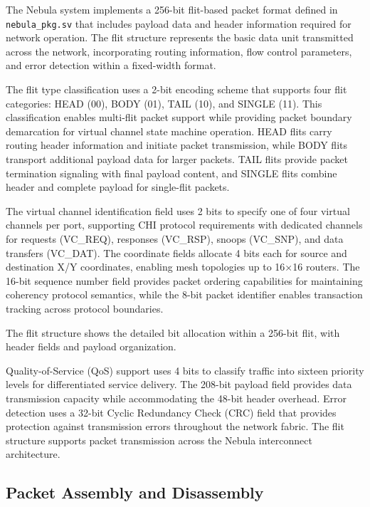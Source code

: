 \documentclass[12pt,letterpaper]{article}
\begin{document}
The Nebula system implements a 256-bit flit-based packet format defined in \texttt{nebula\_pkg.sv} that includes payload data and header information required for network operation. The flit structure represents the basic data unit transmitted across the network, incorporating routing information, flow control parameters, and error detection within a fixed-width format.

The flit type classification uses a 2-bit encoding scheme that supports four flit categories: HEAD (00), BODY (01), TAIL (10), and SINGLE (11). This classification enables multi-flit packet support while providing packet boundary demarcation for virtual channel state machine operation. HEAD flits carry routing header information and initiate packet transmission, while BODY flits transport additional payload data for larger packets. TAIL flits provide packet termination signaling with final payload content, and SINGLE flits combine header and complete payload for single-flit packets.

The virtual channel identification field uses 2 bits to specify one of four virtual channels per port, supporting CHI protocol requirements with dedicated channels for requests (VC\_REQ), responses (VC\_RSP), snoops (VC\_SNP), and data transfers (VC\_DAT). The coordinate fields allocate 4 bits each for source and destination X/Y coordinates, enabling mesh topologies up to 16×16 routers. The 16-bit sequence number field provides packet ordering capabilities for maintaining coherency protocol semantics, while the 8-bit packet identifier enables transaction tracking across protocol boundaries.

The flit structure shows the detailed bit allocation within a 256-bit flit, with header fields and payload organization.

Quality-of-Service (QoS) support uses 4 bits to classify traffic into sixteen priority levels for differentiated service delivery. The 208-bit payload field provides data transmission capacity while accommodating the 48-bit header overhead. Error detection uses a 32-bit Cyclic Redundancy Check (CRC) field that provides protection against transmission errors throughout the network fabric. The flit structure supports packet transmission across the Nebula interconnect architecture.

\subsection{Packet Assembly and Disassembly}
\end{document}
